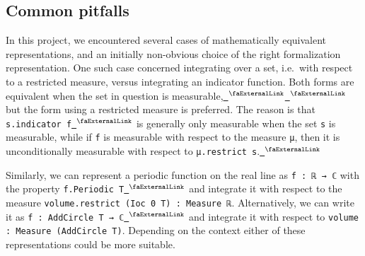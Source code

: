 \documentclass[12pt, reqno]{amsart}
\let\lean\lstinline
\newcommand{\extlink}{~\ensuremath{{}^\text{\faExternalLink}}}
\theoremstyle{definition}
\theoremstyle{plain}
\begin{document}
\subsection{Common pitfalls}\label{subsec:pitfalls}

In this project, we encountered several cases of mathematically equivalent representations, and an initially non-obvious choice of the right formalization representation. One such case concerned integrating over a set, i.e.\ with respect to a restricted measure, versus integrating an indicator function.
Both forms are equivalent when the set in question is measurable,\href{https://github.com/leanprover-community/mathlib4/blob/b63493a4746b4651fceb3bcf3a4651cc36a4b8de/Mathlib/MeasureTheory/Integral/Lebesgue/Basic.lean#L496-L503}{\extlink}\href{https://github.com/leanprover-community/mathlib4/blob/b63493a4746b4651fceb3bcf3a4651cc36a4b8de/Mathlib/MeasureTheory/Integral/Bochner/Set.lean#L170-L183}{\extlink}
but the form using a restricted measure is preferred.
The reason is that \lean{s.indicator f}\href{https://github.com/leanprover-community/mathlib4/blob/b63493a4746b4651fceb3bcf3a4651cc36a4b8de/Mathlib/Algebra/Notation/Indicator.lean#L51-L51}{\extlink}
is generally only measurable when the set \lean{s} is measurable,
while if \lean{f} is measurable with respect to the measure \lean{μ}, then it is unconditionally
measurable with respect to \lean{μ.restrict s}.\href{https://github.com/leanprover-community/mathlib4/blob/b63493a4746b4651fceb3bcf3a4651cc36a4b8de/Mathlib/MeasureTheory/Function/StronglyMeasurable/AEStronglyMeasurable.lean#L220-L223}{\extlink}

Similarly, we can represent a periodic function on the real line as \lean{f : ℝ → ℂ} with the property \lean{f.Periodic T}\href{https://github.com/leanprover-community/mathlib4/blob/b63493a4746b4651fceb3bcf3a4651cc36a4b8de/Mathlib/Algebra/Ring/Periodic.lean#L43-L44}{\extlink} and integrate it with respect to the measure \lean{volume.restrict (Ioc 0 T) : Measure ℝ}. Alternatively, we can write it as \lean{f : AddCircle T → ℂ}\href{https://github.com/leanprover-community/mathlib4/blob/b63493a4746b4651fceb3bcf3a4651cc36a4b8de/Mathlib/Topology/Instances/AddCircle/Defs.lean#L187-L188}{\extlink} and integrate it with respect to \lean{volume : Measure (AddCircle T)}.
Depending on the context either of these representations could be more suitable.
\end{document}
